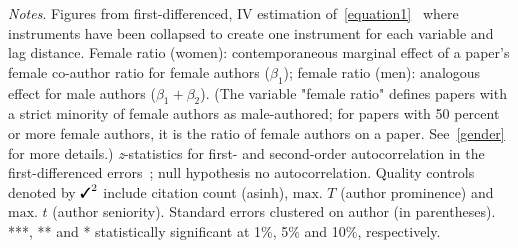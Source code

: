 \begin{table}
\begin{threeparttable}
\begin{tablenotes}
            \item \textit{Notes}. Figures from first-differenced, IV estimation of~\autoref{equation1}~\citep{Arellano1995,Blundell1998} where instruments have been collapsed to create one instrument for each variable and lag distance. Female ratio (women): contemporaneous marginal effect of a paper's female co-author ratio for female authors (\(\beta_1\)); female ratio (men): analogous effect for male authors (\(\beta_1+\beta_2\)). (The variable "female ratio" defines papers with a strict minority of female authors as male-authored; for papers with 50 percent or more female authors, it is the ratio of female authors on a paper. See~\autoref{gender} for more details.) \textit{z}-statistics for first- and second-order autocorrelation in the first-differenced errors~\citep{Arellano1991}; null hypothesis no autocorrelation. Quality controls denoted by \(\text{\ding{51}}^2\) include citation count (asinh), \(\text{max. }T\) (author prominence) and \(\text{max. }t\) (author seniority). Standard errors clustered on author (in parentheses). ***, ** and * statistically significant at 1\%, 5\% and 10\%, respectively.
        \end{tablenotes}
    \end{threeparttable}
\end{table}